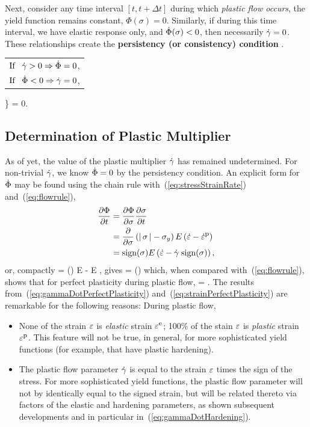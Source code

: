 Next, consider any time interval $[t, t + \Delta t]$ 
during which {\em plastic flow occurs}, the yield function 
remains constant, $\Phi(\sigma) = 0$.  Similarly, 
if during this time interval, 
we have elastic response only, and $\dot{\Phi}(\sigma) < 0$, 
then necessarily $\dot{\gamma} = 0$.  These relationships create 
the {\bf persistency (or consistency) condition}
\be
 \left.
  \begin{tabular}{l}
   $\mbox{If} \;\;\; \gammadot > 0 \Rightarrow \Phidot = 0$, \\
   $\mbox{If} \;\;\; \Phidot < 0 \Rightarrow \gammadot = 0$,
  \end{tabular}
  \right\} 
  \;\;\; \Rightarrow \;\;\;
  \gammadot \; \Phidot = 0.
 \label{eq:persistencyCondition}
\ee



\subsection{Determination of Plastic Multiplier}
As of yet, the value of the plastic multiplier $\dot{\gamma}$ 
has remained undetermined.  For non-trivial $\dot{\gamma}$, we
know $\dot{\Phi} = 0$ by the persistency condition.  
An explicit form for $\dot{\Phi}$ may be found using 
the chain rule with~(\ref{eq:stressStrainRate}) 
and~(\ref{eq:flowrule}), 
\begin{align}
 \frac{\partial \Phi}{\partial t} &= \displaystyle\frac{\partial \Phi}{\partial \sigma} 
 \displaystyle\frac{\partial \sigma}{\partial t} 
 \nonumber \\
 &=  \displaystyle\frac{\partial }{\partial \sigma} \left(| \, \sigma \, | - 
 \sigma_y \right) E \left( \dot{\varepsilon} - \dot{\varepsilon}^{\mbox{\footnotesize p}} \right) \nonumber \\
 &= \mbox{sign}(\sigma) E \left( \dot{\varepsilon} - \dot{\gamma} \; \mbox{sign}(\sigma) \right), 
 \label{eq:PhiChainRule}
\end{align}
or, compactly
\be
 \Phidot = \sign(\sigma) E \hstraindot - E \gammadot \; \setequal {},
\ee
gives
\be
 \gammadot = \hstraindot \; \sign(\sigma)
 \label{eq:gammaDotPerfectPlasticity}
\ee
which, when compared with~(\ref{eq:flowrule}), shows that for 
perfect plasticity during plastic flow, 
\be
 \hstrain = \hstrainp.
 \label{eq:strainPerfectPlasticity}
\ee
The results from~(\ref{eq:gammaDotPerfectPlasticity}) 
and~(\ref{eq:strainPerfectPlasticity}) 
are remarkable for the following reasons:  During plastic flow, 
\begin{itemize}
 \item None of the strain $\varepsilon$ is {\em elastic} strain $\varepsilon^{\mbox{\footnotesize e}}$; 
 100\% of the stain $\varepsilon$ is {\em plastic} strain $\varepsilon^{\mbox{\footnotesize p}}$.
 This feature will not be true, in general, for more sophisticated yield 
 functions (for example, that have plastic hardening).
 \item The plastic flow parameter $\dot{\gamma}$ is equal to the strain 
 $\varepsilon$ times the sign of the stress. 
 For more sophisticated yield functions, the plastic flow 
 parameter will not by identically 
 equal to the signed strain, but will be related thereto via 
 factors of the elastic and hardening parameters, as shown subsequent
 developments and in particular in~(\ref{eq:gammaDotHardening}).
\end{itemize}

